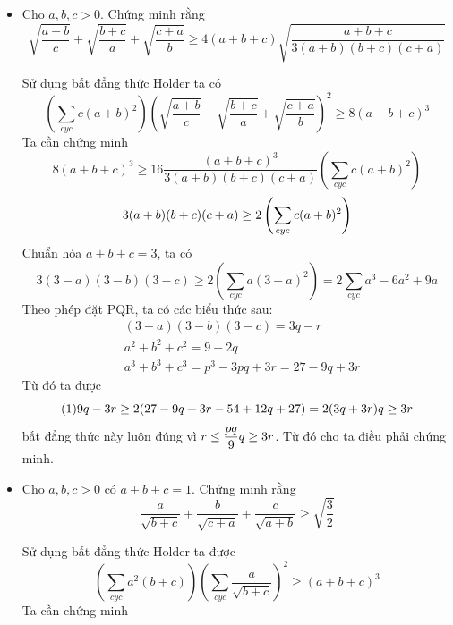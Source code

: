 \documentclass[11pt]{scrartcl}
\begin{document}
\begin{itemize}[label=, leftmargin=0em, itemsep=0.5em]
        \item\begin{btvn}
            Cho $a,b,c > 0$. Chứng minh rằng
            \[\sqrt{\frac{a + b}{c}} + \sqrt{\frac{b + c}{a}} + \sqrt{\frac{c + a}{b}} \geq 4(a +b + c)\sqrt{\frac{a + b + c}{3(a + b)(b + c)(c + a)}}
            \]
        \end{btvn}
        \begin{sol}
        Sử dụng bất đẳng thức Holder ta có 
            \[
                \left(\sum_{cyc}c(a+b)^2\right)\left(\sqrt{\frac{a + b}{c}} + \sqrt{\frac{b + c}{a}} + \sqrt{\frac{c + a}{b}}\right)^2 \geq 8(a + b +c)^3
            \]
            Ta cần chứng minh 
            \[
                    8(a + b + c)^3 \geq 16\frac{(a + b + c)^3}{3(a + b)(b + c)(c + a)} \left(\sum_{cyc}c(a+b)^2\right)
            \]
            \[
                \lra 3(a + b)(b + c)(c + a) \geq 2 \left(\sum_{cyc}c(a+b)^2\right)
            \]
            Chuẩn hóa $a + b + c = 3$, ta có 
            \[
                3(3 - a)(3 - b)(3 - c) \geq 2\left(\sum_{cyc}a(3-a)^2\right) = 2\sum_{cyc}a^3 - 6a^2 + 9a \tag{1}
            \]
            Theo phép đặt PQR, ta có các biểu thức sau:
                \begin{align*}
                    &(3 - a)(3 - b)(3 - c) = 3q - r\\
                    &a^2 + b^2 + c^2 = 9 -2q\\
                    &a^3 + b^3 + c^3 = p^3 - 3pq + 3r = 27 - 9q + 3r
                \end{align*}
                Từ đó ta được
            \[
                (1) \lra 9q - 3r \geq 2(27 - 9q + 3r - 54 + 12q +27) = 2(3q +3r) \lra q \geq 3r
            \]
            bất đẳng thức này luôn đúng vì $ r \leq \frac{pq}{9} \lra q \geq 3r$. Từ đó cho ta điều phải chứng minh.
            \end{sol}
            \item\begin{btvn}
                Cho $a,b,c > 0$ có $a + b + c = 1$. Chứng minh rằng
                \[
                    \frac{a}{\sqrt{b + c}} + \frac{b}{\sqrt{c + a}} + \frac{c}{\sqrt{a + b}} \geq \sqrt{\frac{3}{2}}
                \]
            \end{btvn}
            \begin{sol}
                Sử dụng bất đẳng thức Holder ta được
                \[
                    \left(\sum_{cyc}a^2(b + c)\right)\left(\sum_{cyc}\frac{a}{\sqrt{b + c}}\right)^2 \geq (a + b + c)^3
                \]
                Ta cần chứng minh 

\end{sol}
\end{itemize}
\end{document}

